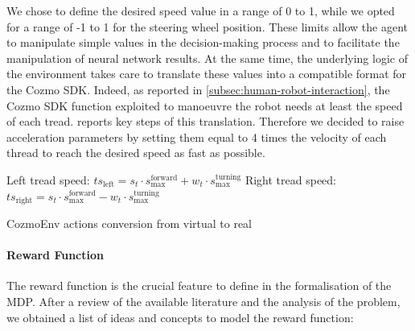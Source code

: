 We chose to define the desired speed value in a range of 0 to 1, while we opted for a range of -1 to 1 for the steering wheel position.
These limits allow the agent to manipulate simple values in the decision-making process and to facilitate the manipulation of neural network results.
At the same time, the underlying logic of the environment takes care to translate these values into a compatible format for the Cozmo SDK.
Indeed, as reported in \vref{subsec:human-robot-interaction}, the Cozmo SDK function exploited to manoeuvre the robot needs at least the speed of each tread.
 reports key steps of this translation.
Therefore we decided to raise acceleration parameters by setting them equal to 4 times the velocity of each thread to reach the desired speed as fast as possible.

\begin{algorithm}[!h]
    \SetAlgoLined
    \small
    \DontPrintSemicolon
    \LinesNumbered

    Left tread speed: $ts_{\text{left}} = s_t \cdot s^{\text{forward}}_{\text{max}} + w_t \cdot s^{\text{turning}}_{\text{max}}$\;
    Right tread speed: $ts_{\text{right}} = s_t \cdot s^{\text{forward}}_{\text{max}} - w_t \cdot s^{\text{turning}}_{\text{max}}$

    \caption{CozmoEnv actions conversion from virtual to real}
    \label{conversionCozmoEnv}
\end{algorithm}


\paragraph{Reward Function}

The reward function is the crucial feature to define in the formalisation of the MDP.
After a review of the available literature and the analysis of the problem, we obtained a list of ideas and concepts to model the reward function:

